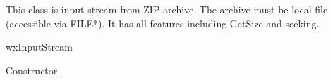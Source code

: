%
%

\section{}\label{wxzipinputstream}

This class is input stream from ZIP archive. The archive
must be local file (accessible via FILE*).
It has all features including GetSize and seeking.


wxInputStream


\label{wxzipinputstreamwxzipinputstream}


Constructor.




